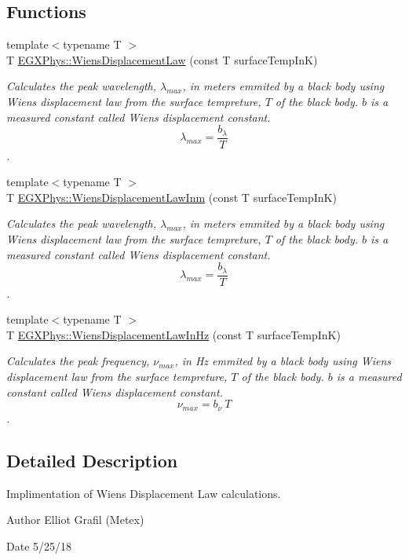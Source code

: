 \subsection*{Functions}
\begin{DoxyCompactItemize}
\item 
{\footnotesize template$<$typename T $>$ }\\T \mbox{\hyperlink{group___e_g_x_phys-_electrodynamics-_black_body-_wiens_displacement_law_ga8f89ce1baac45a1717f604255d04af44}{E\+G\+X\+Phys\+::\+Wiens\+Displacement\+Law}} (const T surface\+Temp\+InK)
\begin{DoxyCompactList}\small\item\em Calculates the peak wavelength, $\lambda_{max}$, in meters emmited by a black body using Wien\textquotesingle{}s displacement law from the surface tempreture, $T$ of the black body. $b$ is a measured constant called Wien\textquotesingle{}s displacement constant. \[\lambda_{max} = \dfrac{b_\lambda}{T} \]. \end{DoxyCompactList}\item 
{\footnotesize template$<$typename T $>$ }\\T \mbox{\hyperlink{group___e_g_x_phys-_electrodynamics-_black_body-_wiens_displacement_law_ga126ebb146c31a2371f1d1d001d11c62f}{E\+G\+X\+Phys\+::\+Wiens\+Displacement\+Law\+Inm}} (const T surface\+Temp\+InK)
\begin{DoxyCompactList}\small\item\em Calculates the peak wavelength, $\lambda_{max}$, in meters emmited by a black body using Wien\textquotesingle{}s displacement law from the surface tempreture, $T$ of the black body. $b$ is a measured constant called Wien\textquotesingle{}s displacement constant. \[\lambda_{max} = \dfrac{b_\lambda}{T} \]. \end{DoxyCompactList}\item 
{\footnotesize template$<$typename T $>$ }\\T \mbox{\hyperlink{group___e_g_x_phys-_electrodynamics-_black_body-_wiens_displacement_law_gaf09ffbc9b7133c16da786c1609ecf689}{E\+G\+X\+Phys\+::\+Wiens\+Displacement\+Law\+In\+Hz}} (const T surface\+Temp\+InK)
\begin{DoxyCompactList}\small\item\em Calculates the peak frequency, $\nu_{max}$, in Hz emmited by a black body using Wien\textquotesingle{}s displacement law from the surface tempreture, $T$ of the black body. $b$ is a measured constant called Wien\textquotesingle{}s displacement constant. \[\nu_{max} = b_\nu\ T \]. \end{DoxyCompactList}\end{DoxyCompactItemize}


\subsection{Detailed Description}
Implimentation of Wien\textquotesingle{}s Displacement Law calculations. 

\begin{DoxyAuthor}{Author}
Elliot Grafil (Metex) 
\end{DoxyAuthor}
\begin{DoxyDate}{Date}
5/25/18 
\end{DoxyDate}
